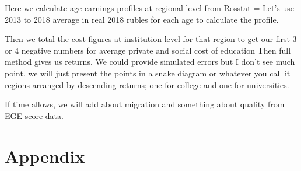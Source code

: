 \documentclass[alpha-refs]{wiley-article-05g}
\begin{document}
\lipsum[4]

Here we calculate age earnings profiles at regional level from Rosstat = Let's use 2013 to 2018 average in real 2018 rubles for each age to calculate the profile.

Then we total the cost figures at institution level for that region to get our first 3 or 4 negative numbers for average private and social cost of education 
Then full method gives us returns. We could provide simulated errors but I don't see much point, we will just present the points in a snake diagram or whatever you call it regions arranged by descending returns; one for college and one for universities.

If time allows, we will add about migration and something about quality from EGE score data.

\printbibliography

\newpage
\section*{Appendix}
%

\setcounter{table}{0}
\renewcommand{\thetable}{A\arabic{table}}
\end{document}

